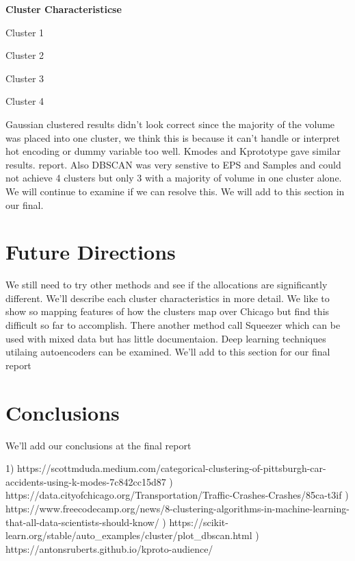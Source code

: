 \documentclass[conference]{IEEEtran}
\begin{document}
\textbf{Cluster Characteristicse} \linebreak

Cluster 1


Cluster 2


Cluster 3



Cluster 4



Gaussian clustered results didn't look correct since the majority of the volume was placed into one cluster, we think this is because it can't handle or interpret hot encoding or dummy variable too well.  Kmodes and Kprototype gave similar results. 
report.  Also DBSCAN was very senstive to EPS and Samples and could not achieve 4 clusters but only 3 with a majority of volume in one cluster alone.  We will continue to examine if we can resolve this.
We will add to this section in our final.

\section{Future Directions}
We still need to try other methods and see if the allocations are significantly different.  We'll describe each cluster characteristics in more detail.
We like to show so mapping features of how the clusters map over Chicago but find this difficult so far to accomplish.  There another method call Squeezer which can be used with mixed data but has little documentaion.  Deep learning techniques utilaing autoencoders can be examined.  We'll add to this section for our final report

\section{Conclusions}
We'll add our conclusions at the final report
 



1) https://scottmduda.medium.com/categorical-clustering-of-pittsburgh-car-accidents-using-k-modes-7c842cc15d87 ) https://data.cityofchicago.org/Transportation/Traffic-Crashes-Crashes/85ca-t3if ) https://www.freecodecamp.org/news/8-clustering-algorithms-in-machine-learning-that-all-data-scientists-should-know/  ) https://scikit-learn.org/stable/auto_examples/cluster/plot_dbscan.html ) https://antonsruberts.github.io/kproto-audience/ \linebreak
\end{document}
